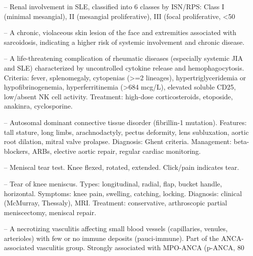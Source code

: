 -- Renal involvement in SLE, classified into 6 classes by ISN/RPS: Class I (minimal mesangial), II (mesangial proliferative), III (focal proliferative, <50%

-- A chronic, violaceous skin lesion of the face and extremities associated with sarcoidosis, indicating a higher risk of systemic involvement and chronic disease.

-- A life-threatening complication of rheumatic diseases (especially systemic JIA and SLE) characterized by uncontrolled cytokine release and hemophagocytosis. Criteria: fever, splenomegaly, cytopenias (>=2 lineages), hypertriglyceridemia or hypofibrinogenemia, hyperferritinemia (>684 mcg/L), elevated soluble CD25, low/absent NK cell activity. Treatment: high-dose corticosteroids, etoposide, anakinra, cyclosporine.

-- Autosomal dominant connective tissue disorder (fibrillin-1 mutation). Features: tall stature, long limbs, arachnodactyly, pectus deformity, lens subluxation, aortic root dilation, mitral valve prolapse. Diagnosis: Ghent criteria. Management: beta-blockers, ARBs, elective aortic repair, regular cardiac monitoring.

-- Meniscal tear test. Knee flexed, rotated, extended. Click/pain indicates tear.

-- Tear of knee meniscus. Types: longitudinal, radial, flap, bucket handle, horizontal. Symptoms: knee pain, swelling, catching, locking. Diagnosis: clinical (McMurray, Thessaly), MRI. Treatment: conservative, arthroscopic partial meniscectomy, meniscal repair.

-- A necrotizing vasculitis affecting small blood vessels (capillaries, venules, arterioles) with few or no immune deposits (pauci-immune). Part of the ANCA-associated vasculitis group. Strongly associated with MPO-ANCA (p-ANCA, 80%


